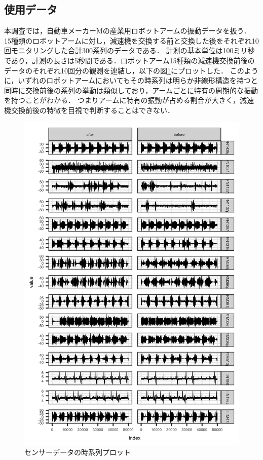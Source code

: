 \documentclass{jarticle}
\begin{document}
\subsection{使用データ}
本調査では，自動車メーカーMの産業用ロボットアームの振動データを扱う．
15種類のロボットアームに対し，減速機を交換する前と交換した後をそれぞれ10回モニタリングした合計300系列のデータである．
計測の基本単位は100ミリ秒であり，計測の長さは5秒間である．ロボットアーム15種類の減速機交換前後のデータのそれぞれ10回分の観測を連結し，以下の図\ref{fig:ts}にプロットした．
このように，いずれのロボットアームにおいてもその時系列は明らか非線形構造を持つと同時に交換前後の系列の挙動は類似しており，アームごとに特有の周期的な振動を持つことがわかる．
つまりアームに特有の振動が占める割合が大きく，減速機交換前後の特徴を目視で判断することはできない．
\begin{figure}[H]
\begin{center}
	\includegraphics[width=12cm]{fig/ts.png}	
	\caption{センサーデータの時系列プロット\label{fig:ts}}
\end{center}
\end{figure}
\end{document}
